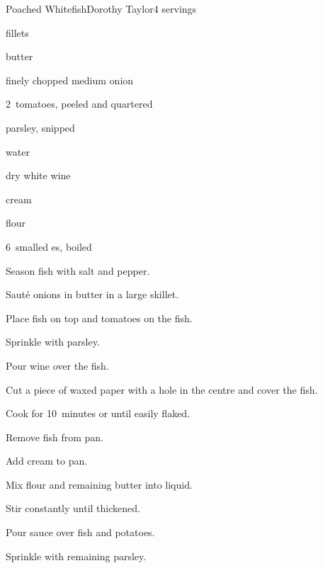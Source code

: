 \begin{recipe}{Poached Whitefish}{Dorothy Taylor}{4 servings}

\begin{ingredients}
\item \lbs{1\threequarter}  fillets
\item {}
\item {}
\item {} butter
\item finely chopped medium onion
\item 2~tomatoes, peeled and quartered
\item \C{\quarter} parsley, snipped
\item \C{\third} water
\item \C{\third} dry white wine
\item \C{\third} cream
\item {} flour
\item 6~smalled es, boiled
\end{ingredients}

\begin{directions}
\item Season fish with salt and pepper.
\item Saut\'e onions in  butter in a large skillet.
\item Place fish on top and tomatoes on the fish.
\item Sprinkle with  parsley.
\item Pour wine over the fish.
\item Cut a piece of waxed paper with a hole in the centre and  cover the fish.
\item Cook for 10~minutes or until easily flaked.
\item Remove fish from pan.
\item Add cream to pan.
\item Mix flour and remaining butter into liquid.
\item Stir constantly until thickened.
\item Pour sauce over fish and potatoes.
\item Sprinkle with remaining parsley.
\end{directions}

\end{recipe}
